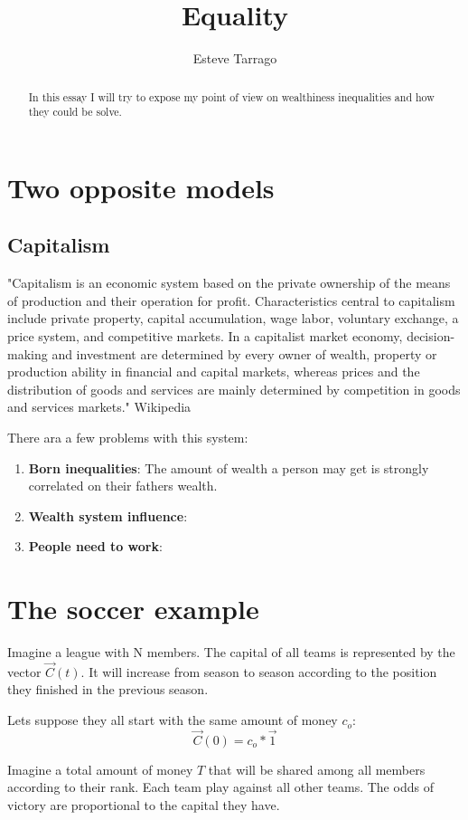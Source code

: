 \documentclass[]{article}
\title{Equality}
\author{Esteve Tarrago}
\begin{document}
\maketitle

\begin{abstract}
    In this essay I will try to expose my point of view on wealthiness inequalities and how they could be solve.
\end{abstract}

\section{Two opposite models}
\subsection{Capitalism}
"Capitalism is an economic system based on the private ownership of the
means of production and their operation for profit. Characteristics central
to capitalism include private property, capital accumulation, wage labor,
voluntary exchange, a price system, and competitive markets.
In a capitalist market economy, decision-making and investment are
determined by every owner of wealth, property or production ability
in financial and capital markets, whereas prices and the distribution
of goods and services are mainly determined by competition in goods
and services markets." Wikipedia

There ara a few problems with this system:
\begin{enumerate}
    \item \textbf{Born inequalities}: The amount of wealth a person may get is
     strongly correlated on their fathers wealth.
    \item \textbf{Wealth system influence}:
    \item \textbf{People need to work}:
\end{enumerate}

\section{The soccer example}
Imagine a league with N members. The capital of all teams is represented by the vector $
\vec{C}(t)$. It will increase from season to season according to the position
they finished in the previous season.

Lets suppose they all start with the same amount of money $c_o$:
\[ \vec{C}(0) = c_o * \vec{1} \]

Imagine a total amount of money $T$ that will be shared among all members according to their rank.
Each team play against all other teams. The odds of victory are proportional to the capital they have.
\end{document}
